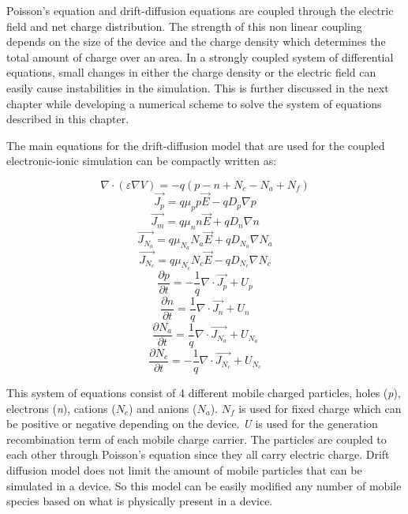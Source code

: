 \begin{doublespace}
Poisson's equation and drift-diffusion equations are coupled through the electric field and net charge distribution. The strength of this non linear coupling depends on the size of the device and the charge density which determines the total amount of charge over an area. In a strongly coupled system of differential equations, small changes in either the charge density or the electric field can easily cause instabilities in the simulation. This is further discussed in the next chapter while developing a numerical scheme to solve the system of equations described in this chapter. 

 The main equations for the drift-diffusion model that are used for the coupled electronic-ionic simulation can be compactly written as:

\begin{equation}
\nabla \cdot  (\varepsilon \nabla V)=-q(p-n+N_{c}-N_{a}+N_{f})
\end{equation}
\begin{equation}
\vec{J_p}=q\mu_p p \vec{E}-q D_p \nabla p
\end{equation}
\begin{equation}
\vec{J_m}=q\mu_n n \vec{E}+q D_n \nabla n
\end{equation}
\begin{equation}
\vec{J_{N_{a}}}=q\mu_{N_{a}} N_{a} \vec{E}+q D_{N_{a}} \nabla N_{a} 
\end{equation}
\begin{equation}
\vec{J_{N_{c}}}=q\mu_{N_{c}} N_{c} \vec{E}-q D_{N_{c}} \nabla N_{c}
\end{equation}
\begin{equation}
\frac{\partial p}{\partial t}=-\frac{1}{q}\nabla \cdot \vec{J_p}  + U_{p}
\end{equation}
\begin{equation}
\frac{\partial n}{\partial t}=\frac{1}{q}\nabla \cdot \vec{J_n}+ U_{n}
\end{equation}
\begin{equation}
\frac{\partial N_{a}}{\partial t}=\frac{1}{q}\nabla \cdot \vec{J_{N_{a}}} + U_{N_{a}}
\end{equation}
\begin{equation}
\frac{\partial N_{c}}{\partial t}=-\frac{1}{q}\nabla \cdot \vec{J_{ N_{c} }}+ U_{N_{c}}
\end{equation}

This system of equations consist of 4 different mobile charged particles, holes (\textit{p}), electrons (\textit{n}), cations (\textit{$N_{c}$}) and anions (\textit{$N_{a}$}). \textit{$N_{f}$} is used for fixed charge which can be positive or negative depending on the device. \textit{U} is used for the generation recombination term of each mobile charge carrier. The particles are coupled to each other through Poisson's equation since they all carry electric charge. Drift diffusion model does not limit the amount of mobile particles that can be simulated in a device. So this model can be easily modified any number of mobile species based on what is physically present in a device.


\end{doublespace}
